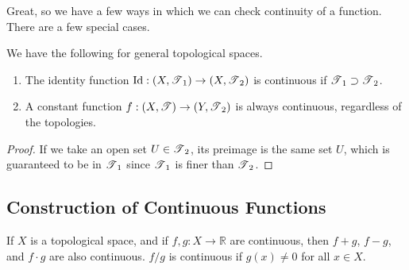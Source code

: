   Great, so we have a few ways in which we can check continuity of a function. There are a few special cases. 

  \begin{lemma}
    We have the following for general topological spaces. 
    \begin{enumerate}
      \item The identity function $\operatorname{Id}: (X, \operatorname{\mathscr{T}}_1) \rightarrow (X, \operatorname{\mathscr{T}}_2)$ is continuous if $\operatorname{\mathscr{T}}_1 \supset \operatorname{\mathscr{T}}_2$. 
      \item A constant function $f: (X, \operatorname{\mathscr{T}}) \rightarrow (Y, \operatorname{\mathscr{T}}_2)$ is always continuous, regardless of the topologies. 
    \end{enumerate}
  \end{lemma}
  \begin{proof}
    If we take an open set $U \in \operatorname{\mathscr{T}}_2$, its preimage is the same set $U$, which is guaranteed to be in $\operatorname{\mathscr{T}}_1$ since $\operatorname{\mathscr{T}}_1$ is finer than $\operatorname{\mathscr{T}}_2$. 
  \end{proof}

\subsection{Construction of Continuous Functions} 

  \begin{theorem}
    If $X$ is a topological space, and if $f, g: X \longrightarrow \mathbb{R}$ are continuous, then $f + g$, $f-g$, and $f \cdot g$ are also continuous. $f / g$ is continuous if $g(x) \neq 0$ for all $x \in X$. 
  \end{theorem}

